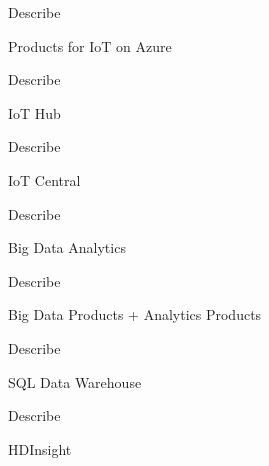 \documentclass{scrartcl}
\newenvironment{flashcard}[2][]{%
    #1
    \vfill
    \centerline{\Large{#2}}
    \vfill
    \newpage
}
{\newpage}
\begin{document}
    \begin{flashcard}[Describe]{Products for IoT on Azure}

    \end{flashcard}

    \begin{flashcard}[Describe]{IoT Hub}

    \end{flashcard}

    \begin{flashcard}[Describe]{IoT Central}

    \end{flashcard}

    \begin{flashcard}[Describe]{Big Data Analytics}

    \end{flashcard}

    \begin{flashcard}[Describe]{Big Data Products + Analytics Products}

    \end{flashcard}

    \begin{flashcard}[Describe]{SQL Data Warehouse}

    \end{flashcard}

    \begin{flashcard}[Describe]{HDInsight}

    \end{flashcard}
\end{document}
